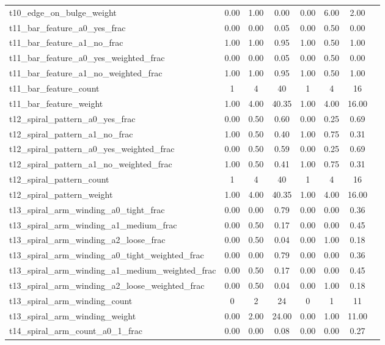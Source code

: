 \begin{table*}
{\begin{tabular}{@{}lccccccc}
t10\_edge\_on\_bulge\_weight & 0.00 & 1.00 & 0.00 & 0.00 & 6.00 & 2.00 &\\
t11\_bar\_feature\_a0\_yes\_frac & 0.00 & 0.00 & 0.05 & 0.00 & 0.50 & 0.00 &\\
t11\_bar\_feature\_a1\_no\_frac & 1.00 & 1.00 & 0.95 & 1.00 & 0.50 & 1.00 &\\
t11\_bar\_feature\_a0\_yes\_weighted\_frac & 0.00 & 0.00 & 0.05 & 0.00 & 0.50 & 0.00 &\\
t11\_bar\_feature\_a1\_no\_weighted\_frac & 1.00 & 1.00 & 0.95 & 1.00 & 0.50 & 1.00 &\\
t11\_bar\_feature\_count & 1 & 4 & 40 & 1 & 4 & 16 &\\
t11\_bar\_feature\_weight & 1.00 & 4.00 & 40.35 & 1.00 & 4.00 & 16.00 &\\
t12\_spiral\_pattern\_a0\_yes\_frac & 0.00 & 0.50 & 0.60 & 0.00 & 0.25 & 0.69 &\\
t12\_spiral\_pattern\_a1\_no\_frac & 1.00 & 0.50 & 0.40 & 1.00 & 0.75 & 0.31 &\\
t12\_spiral\_pattern\_a0\_yes\_weighted\_frac & 0.00 & 0.50 & 0.59 & 0.00 & 0.25 & 0.69 &\\
t12\_spiral\_pattern\_a1\_no\_weighted\_frac & 1.00 & 0.50 & 0.41 & 1.00 & 0.75 & 0.31 &\\
t12\_spiral\_pattern\_count & 1 & 4 & 40 & 1 & 4 & 16 &\\
t12\_spiral\_pattern\_weight & 1.00 & 4.00 & 40.35 & 1.00 & 4.00 & 16.00 &\\
t13\_spiral\_arm\_winding\_a0\_tight\_frac & 0.00 & 0.00 & 0.79 & 0.00 & 0.00 & 0.36 &\\
t13\_spiral\_arm\_winding\_a1\_medium\_frac & 0.00 & 0.50 & 0.17 & 0.00 & 0.00 & 0.45 &\\
t13\_spiral\_arm\_winding\_a2\_loose\_frac & 0.00 & 0.50 & 0.04 & 0.00 & 1.00 & 0.18 &\\
t13\_spiral\_arm\_winding\_a0\_tight\_weighted\_frac & 0.00 & 0.00 & 0.79 & 0.00 & 0.00 & 0.36 &\\
t13\_spiral\_arm\_winding\_a1\_medium\_weighted\_frac & 0.00 & 0.50 & 0.17 & 0.00 & 0.00 & 0.45 &\\
t13\_spiral\_arm\_winding\_a2\_loose\_weighted\_frac & 0.00 & 0.50 & 0.04 & 0.00 & 1.00 & 0.18 &\\
t13\_spiral\_arm\_winding\_count & 0 & 2 & 24 & 0 & 1 & 11 &\\
t13\_spiral\_arm\_winding\_weight & 0.00 & 2.00 & 24.00 & 0.00 & 1.00 & 11.00 &\\
t14\_spiral\_arm\_count\_a0\_1\_frac & 0.00 & 0.00 & 0.08 & 0.00 & 0.00 & 0.27 &\\

\end{tabular}}
\end{table*}
